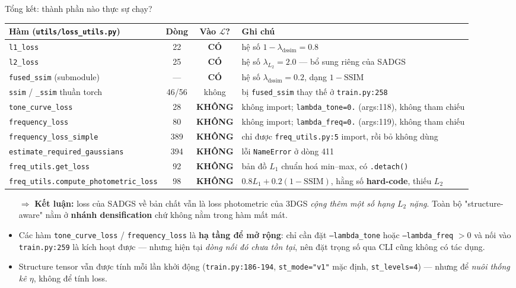 \begin{frame}{Tổng kết: thành phần nào thực sự chạy?}
\footnotesize
\begin{table}
\centering
\begin{tabular}{lccl}
\toprule
\textbf{Hàm} (\texttt{utils/loss\_utils.py}) & \textbf{Dòng} & \textbf{Vào $\mathcal{L}$?} & \textbf{Ghi chú} \\
\midrule
\texttt{l1\_loss} & 22 & \textbf{CÓ} & hệ số $1-\lambda_{\text{dssim}} = 0.8$ \\
\texttt{l2\_loss} & 25 & \textbf{CÓ} & hệ số $\lambda_{L_2} = 2.0$ --- bổ sung riêng của SADGS \\
\texttt{fused\_ssim} (submodule) & --- & \textbf{CÓ} & hệ số $\lambda_{\text{dssim}} = 0.2$, dạng $1-\mathrm{SSIM}$ \\
\midrule
\texttt{ssim} / \texttt{\_ssim} thuần torch & 46/56 & không & bị \texttt{fused\_ssim} thay thế ở \texttt{train.py:258} \\
\texttt{tone\_curve\_loss} & 28 & \textbf{KHÔNG} & không import; \texttt{lambda\_tone=0.} (args:118), không tham chiếu \\
\texttt{frequency\_loss} & 80 & \textbf{KHÔNG} & không import; \texttt{lambda\_freq=0.} (args:119), không tham chiếu \\
\texttt{frequency\_loss\_simple} & 389 & \textbf{KHÔNG} & chỉ được \texttt{freq\_utils.py:5} import, rồi bỏ không dùng \\
\texttt{estimate\_required\_gaussians} & 394 & \textbf{KHÔNG} & lỗi \texttt{NameError} ở dòng 411 \\
\midrule
\texttt{freq\_utils.get\_loss} & 92 & \textbf{KHÔNG} & bản đồ $L_1$ chuẩn hoá min--max, có \texttt{.detach()} \\
\texttt{freq\_utils.compute\_photometric\_loss} & 98 & \textbf{KHÔNG} & $0.8L_1 + 0.2(1-\mathrm{SSIM})$, hằng số \textbf{hard-code}, thiếu $L_2$ \\
\bottomrule
\end{tabular}
\end{table}
\begin{itemize}
    \item[$\Rightarrow$] \textbf{Kết luận:} loss của SADGS về bản chất vẫn là loss photometric của 3DGS \emph{cộng thêm một số hạng $L_2$ nặng}. Toàn bộ "structure-aware" nằm ở \textbf{nhánh densification} chứ không nằm trong hàm mất mát.
    \item Các hàm \texttt{tone\_curve\_loss} / \texttt{frequency\_loss} là \textbf{hạ tầng để mở rộng}: chỉ cần đặt \texttt{--lambda\_tone} hoặc \texttt{--lambda\_freq} $>0$ và nối vào \texttt{train.py:259} là kích hoạt được --- nhưng hiện tại \emph{dòng nối đó chưa tồn tại}, nên đặt trọng số qua CLI cũng không có tác dụng.
    \item Structure tensor vẫn được tính mỗi lần khởi động (\texttt{train.py:186-194}, \texttt{st\_mode="v1"} mặc định, \texttt{st\_levels=4}) --- nhưng để \emph{nuôi thống kê $\eta$}, không để tính loss.
\end{itemize}
\end{frame}
